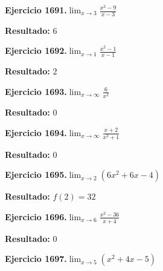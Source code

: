\documentclass[10pt,a4paper]{article}
\begin{document}
\begin{ejbox}
\textbf{Ejercicio 1691.}\quad $\lim_{x\to 3} \frac{x^2-9}{x-3}$
\end{ejbox}

\begin{solbox}
\textbf{Resultado:} \(\displaystyle 6\)
\end{solbox}

\begin{ejbox}
\textbf{Ejercicio 1692.}\quad $\lim_{x\to 1} \frac{x^2-1}{x-1}$
\end{ejbox}

\begin{solbox}
\textbf{Resultado:} \(\displaystyle 2\)
\end{solbox}

\newpage
\begin{ejbox}
\textbf{Ejercicio 1693.}\quad $\lim_{x\to \infty} \frac{6}{x^2}$
\end{ejbox}

\begin{solbox}
\textbf{Resultado:} \(\displaystyle 0\)
\end{solbox}

\begin{ejbox}
\textbf{Ejercicio 1694.}\quad $\lim_{x\to \infty} \frac{x + 2}{x^2 + 1}$
\end{ejbox}

\begin{solbox}
\textbf{Resultado:} \(\displaystyle 0\)
\end{solbox}

\begin{ejbox}
\textbf{Ejercicio 1695.}\quad $\lim_{x\to 2} (6x^2 +6x -4)$
\end{ejbox}

\begin{solbox}
\textbf{Resultado:} \(\displaystyle f(2) = 32\)
\end{solbox}

\newpage
\begin{ejbox}
\textbf{Ejercicio 1696.}\quad $\lim_{x\to 6} \frac{x^2-36}{x+4}$
\end{ejbox}

\begin{solbox}
\textbf{Resultado:} \(\displaystyle 0\)
\end{solbox}

\begin{ejbox}
\textbf{Ejercicio 1697.}\quad $\lim_{x\to 5} (x^2 +4x -5)$
\end{ejbox}
\end{document}
